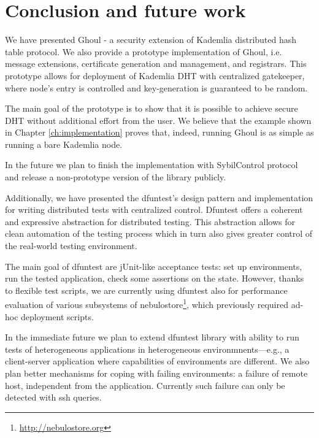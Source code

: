 \chapter{Conclusion and future work}
\label{ch:conclusion}
We have presented Ghoul - a security extension of Kademlia distributed hash table protocol.
We also provide a prototype implementation of Ghoul, i.e. message extensions,
certificate generation and management, and registrars.
This prototype allows for deployment of Kademlia DHT with centralized
gatekeeper, where node's entry is controlled and key-generation is guaranteed to
be random.

The main goal of the prototype is to show that it is possible to achieve secure
DHT without additional effort from the user.
We believe that the example shown in Chapter \ref{ch:implementation} proves
that, indeed, running Ghoul is as simple as running a bare Kademlia node.

In the future we plan to finish the implementation with SybilControl protocol
and release a non-prototype version of the library publicly.

Additionally, we have presented the dfuntest's design pattern and implementation
for writing distributed tests with centralized control.
Dfuntest offers a coherent and expressive abstraction for distributed testing.
This abstraction allows for clean automation of the testing process which in
turn also gives greater control of the real-world testing environment.

The main goal of dfuntest are jUnit-like acceptance tests: set up environments,
run the tested application, check some assertions on the state. However, thanks
to flexible test scripts, we are currently using dfuntest also for performance
evaluation of various subsystems of
nebulostore\footnote{\url{http://nebulostore.org}}, which previously required
ad-hoc deployment scripts.

In the immediate future we plan to extend dfuntest library with ability to run
tests of heterogeneous applications in heterogeneous environmnents---e.g., a
client-server application where capabilities of environments are different.
We also plan better mechanisms for coping with failing environments: a failure
of remote host, independent from the application. Currently such failure can
only be detected with ssh queries.
